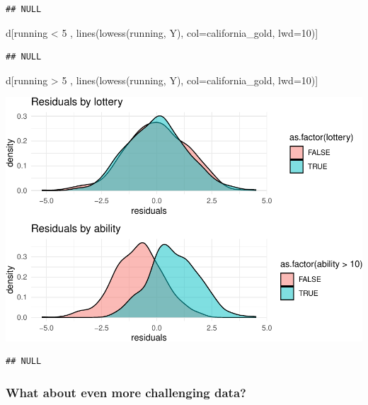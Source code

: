 \documentclass[
]{article}
\newenvironment{Shaded}{\begin{snugshade}}{\end{snugshade}}
\newcommand{\AttributeTok}[1]{\textcolor[rgb]{0.77,0.63,0.00}{#1}}
\newcommand{\DecValTok}[1]{\textcolor[rgb]{0.00,0.00,0.81}{#1}}
\newcommand{\FunctionTok}[1]{\textcolor[rgb]{0.00,0.00,0.00}{#1}}
\newcommand{\NormalTok}[1]{#1}
\newcommand{\SpecialCharTok}[1]{\textcolor[rgb]{0.00,0.00,0.00}{#1}}
\begin{document}
\begin{verbatim}
## NULL
\end{verbatim}

\begin{Shaded}
\begin{Highlighting}[]
\NormalTok{    d[running }\SpecialCharTok{\textless{}} \DecValTok{5}\NormalTok{ , }\FunctionTok{lines}\NormalTok{(}\FunctionTok{lowess}\NormalTok{(running, Y), }\AttributeTok{col=}\NormalTok{california\_gold, }\AttributeTok{lwd=}\DecValTok{10}\NormalTok{)]}
\end{Highlighting}
\end{Shaded}

\begin{verbatim}
## NULL
\end{verbatim}

\begin{Shaded}
\begin{Highlighting}[]
\NormalTok{    d[running }\SpecialCharTok{\textgreater{}} \DecValTok{5}\NormalTok{ , }\FunctionTok{lines}\NormalTok{(}\FunctionTok{lowess}\NormalTok{(running, Y), }\AttributeTok{col=}\NormalTok{california\_gold, }\AttributeTok{lwd=}\DecValTok{10}\NormalTok{)]  }
\end{Highlighting}
\end{Shaded}

\includegraphics{241-live-session_files/figure-latex/unnamed-chunk-24-1.pdf}

\begin{verbatim}
## NULL
\end{verbatim}

\hypertarget{what-about-even-more-challenging-data}{%
\subsubsection{What about even more challenging data?}\label{what-about-even-more-challenging-data}}
\end{document}

